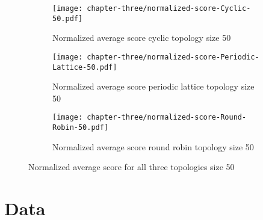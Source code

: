 \begin{figure}[H]
	\centering
	\begin{subfigure}[t]{0.75\textwidth}
		\centering
		\texttt{[image: chapter-three/normalized-score-Cyclic-50.pdf]}
		\caption{Normalized average score cyclic topology size 50}
	\end{subfigure}
	\hfill
	\begin{subfigure}[t]{0.75\textwidth}\centering
		\centering
		\texttt{[image: chapter-three/normalized-score-Periodic-Lattice-50.pdf]}
		\caption{Normalized average score periodic lattice topology size 50}
	\end{subfigure}
	\hfill
	\begin{subfigure}[t]{0.75\textwidth}\centering
		\centering
		\texttt{[image: chapter-three/normalized-score-Round-Robin-50.pdf]}
		\caption{Normalized average score round robin topology size 50}
	\end{subfigure}
	\caption{Normalized average score for all three topologies size 50}
	\label{fig:average-score-fifty}
\end{figure}

\chapter{Data}
